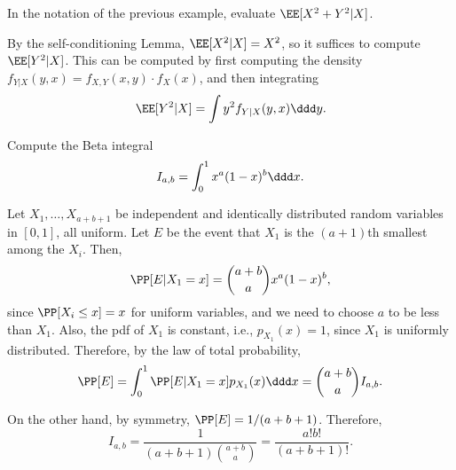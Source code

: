 \begin{example}
\exlabel

In the notation of the previous example, evaluate $\EE[X^2+Y^2\vert X]$. 
\end{example}

By the self-conditioning Lemma, $\EE[X^2|X] = X^2$, so it suffices to compute $\EE[Y^2|X]$.
This can be computed by first computing the density $f_{Y|X}(y,x) = f_{X,Y}(x,y)\cdot f_{X}(x)$, and then integrating
\[\EE[Y^2|X] = \int y^2f_{Y|X}(y,x)\ddd y.\]

\begin{example}
\exlabel

Compute the Beta integral
\[I_{a,b} = \int_0^1 x^a(1-x)^b\ddd x.\]
\end{example}

Let $X_1, \hdots, X_{a+b+1}$ be independent and identically distributed random variables in $[0,1]$, all uniform. Let $E$ be the event that $X_1$ is the $(a+1)$th smallest among the $X_i$. Then, 
\[\PP[E | X_1=x] = \binom{a+b}{a}x^a(1-x)^b,\]
since $\PP[X_i\leq x]=x$ for uniform variables, and we need to choose $a$ to be less than $X_1$. Also, the pdf of $X_1$ is constant, i.e., $p_{X_1}(x) = 1$, since $X_1$ is uniformly distributed. Therefore, by the law of total probability, 
\[\PP[E] = \int_0^1\PP[E \vert X_1=x]p_{X_1}(x)\ddd x = \binom{a+b}{a}I_{a,b}.\]

On the other hand, by symmetry, $\PP[E] = 1/(a+b+1)$. Therefore, 
\[I_{a,b} = \frac{1}{(a+b+1)\binom{a+b}{a}} = \frac{a!b!}{(a+b+1)!}.\]



